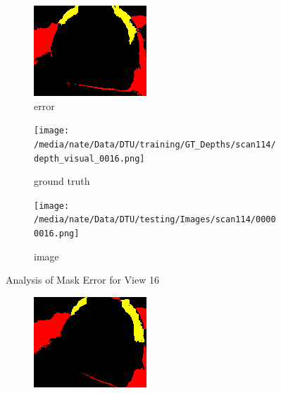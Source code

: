 \documentclass{article}
\begin{document}
\begin{figure}
\begin{subfigure}{0.3\textwidth}
		\includegraphics[width=\textwidth]{./output/016_error.png}
		\caption{error}
		\label{fig:error16}
	\end{subfigure}
	\hfill
	\centering
	\begin{subfigure}{0.3\textwidth}
		\centering
		\texttt{[image: /media/nate/Data/DTU/training/GT\_Depths/scan114/depth\_visual\_0016.png]}
		\caption{ground truth}
		\label{fig:gt16}
	\end{subfigure}
	\hfill
	\centering
	\begin{subfigure}{0.3\textwidth}
		\centering
		\texttt{[image: /media/nate/Data/DTU/testing/Images/scan114/00000016.png]}
		\caption{image}
		\label{fig:img16}
	\end{subfigure}
	\hfill
	\caption{Analysis of Mask Error for View 16}
	\label{fig:error_analys16}
\end{figure}\begin{figure}
	\centering
	\begin{subfigure}{0.3\textwidth}
		\centering
		\includegraphics[width=\textwidth]{./output/017_error.png}

\end{subfigure}
\end{figure}
\end{document}
